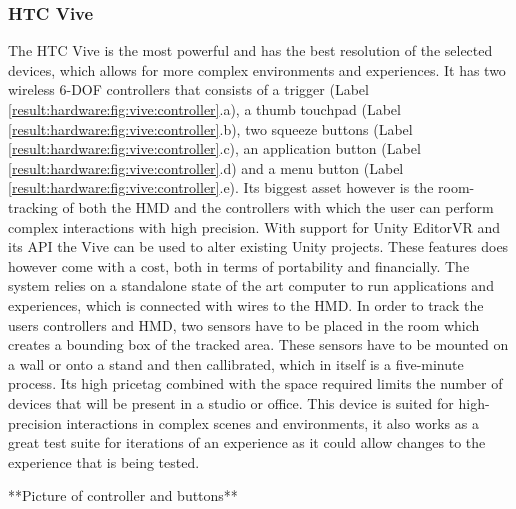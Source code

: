 \subsubsection{HTC Vive}
\label{result:hardware:vive}

The HTC Vive is the most powerful and has the best resolution of the selected devices, which allows for more complex environments and experiences. It has two wireless 6-DOF controllers that consists of a trigger (Label \ref{result:hardware:fig:vive:controller}.a), a thumb touchpad (Label \ref{result:hardware:fig:vive:controller}.b), two squeeze buttons (Label \ref{result:hardware:fig:vive:controller}.c), an application button (Label \ref{result:hardware:fig:vive:controller}.d) and a menu button (Label \ref{result:hardware:fig:vive:controller}.e). Its biggest asset however is the room-tracking of both the HMD and the controllers with which the user can perform complex interactions with high precision. With support for Unity EditorVR and its API the Vive can be used to alter existing Unity projects.
These features does however come with a cost, both in terms of portability and financially. The system relies on a standalone state of the art computer to run applications and experiences, which is connected with wires to the HMD. In order to track the users controllers and HMD, two sensors have to be placed in the room which creates a bounding box of the tracked area. These sensors have to be mounted on a wall or onto a stand and then callibrated, which in itself is a five-minute process. Its high pricetag combined with the space required limits the number of devices that will be present in a studio or office.
This device is suited for high-precision interactions in complex scenes and environments, it also works as a great test suite for iterations of an experience as it could allow changes to the experience that is being tested.

**Picture of controller and buttons**
